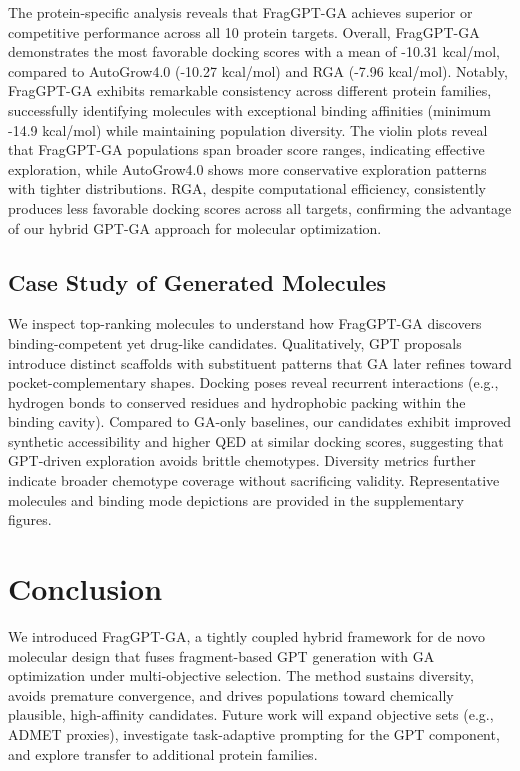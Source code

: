 \documentclass[lettersize,journal]{IEEEtran}
\begin{document}
The protein-specific analysis reveals that FragGPT-GA achieves superior or competitive performance across all 10 protein targets. Overall, FragGPT-GA demonstrates the most favorable docking scores with a mean of -10.31 kcal/mol, compared to AutoGrow4.0 (-10.27 kcal/mol) and RGA (-7.96 kcal/mol). Notably, FragGPT-GA exhibits remarkable consistency across different protein families, successfully identifying molecules with exceptional binding affinities (minimum -14.9 kcal/mol) while maintaining population diversity. The violin plots reveal that FragGPT-GA populations span broader score ranges, indicating effective exploration, while AutoGrow4.0 shows more conservative exploration patterns with tighter distributions. RGA, despite computational efficiency, consistently produces less favorable docking scores across all targets, confirming the advantage of our hybrid GPT-GA approach for molecular optimization.

\subsection{Case Study of Generated Molecules}
We inspect top-ranking molecules to understand how FragGPT-GA discovers binding-competent yet drug-like candidates. Qualitatively, GPT proposals introduce distinct scaffolds with substituent patterns that GA later refines toward pocket-complementary shapes. Docking poses reveal recurrent interactions (e.g., hydrogen bonds to conserved residues and hydrophobic packing within the binding cavity). Compared to GA-only baselines, our candidates exhibit improved synthetic accessibility and higher QED at similar docking scores, suggesting that GPT-driven exploration avoids brittle chemotypes. Diversity metrics further indicate broader chemotype coverage without sacrificing validity. Representative molecules and binding mode depictions are provided in the supplementary figures.

\section{Conclusion}
We introduced FragGPT-GA, a tightly coupled hybrid framework for de novo molecular design that fuses fragment-based GPT generation with GA optimization under multi-objective selection. The method sustains diversity, avoids premature convergence, and drives populations toward chemically plausible, high-affinity candidates. Future work will expand objective sets (e.g., ADMET proxies), investigate task-adaptive prompting for the GPT component, and explore transfer to additional protein families.
\end{document}
